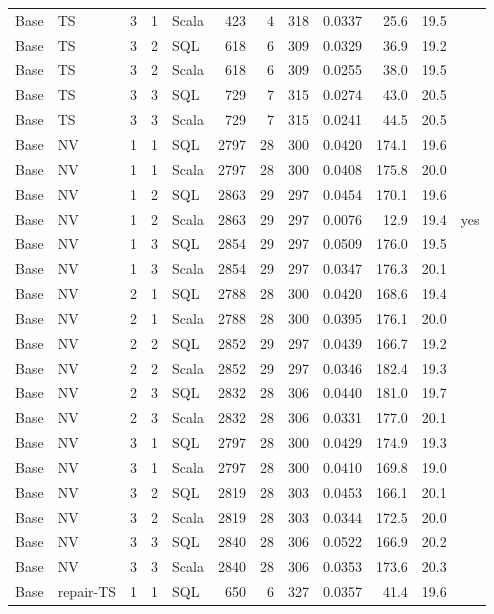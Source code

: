 {\begin{longtable}{@{}llcclrrrrrrc@{}}
Base & TS & 3 & 1 & Scala & 423 & 4 & 318 & 0.0337 & 25.6 & 19.5 & \\
Base & TS & 3 & 2 & SQL & 618 & 6 & 309 & 0.0329 & 36.9 & 19.2 & \\
Base & TS & 3 & 2 & Scala & 618 & 6 & 309 & 0.0255 & 38.0 & 19.5 & \\
Base & TS & 3 & 3 & SQL & 729 & 7 & 315 & 0.0274 & 43.0 & 20.5 & \\
Base & TS & 3 & 3 & Scala & 729 & 7 & 315 & 0.0241 & 44.5 & 20.5 & \\
Base & NV & 1 & 1 & SQL & 2797 & 28 & 300 & 0.0420 & 174.1 & 19.6 & \\
Base & NV & 1 & 1 & Scala & 2797 & 28 & 300 & 0.0408 & 175.8 & 20.0 & \\
Base & NV & 1 & 2 & SQL & 2863 & 29 & 297 & 0.0454 & 170.1 & 19.6 & \\
Base & NV & 1 & 2 & Scala & 2863 & 29 & 297 & 0.0076 & 12.9 & 19.4 & yes\\
Base & NV & 1 & 3 & SQL & 2854 & 29 & 297 & 0.0509 & 176.0 & 19.5 & \\
Base & NV & 1 & 3 & Scala & 2854 & 29 & 297 & 0.0347 & 176.3 & 20.1 & \\
Base & NV & 2 & 1 & SQL & 2788 & 28 & 300 & 0.0420 & 168.6 & 19.4 & \\
Base & NV & 2 & 1 & Scala & 2788 & 28 & 300 & 0.0395 & 176.1 & 20.0 & \\
Base & NV & 2 & 2 & SQL & 2852 & 29 & 297 & 0.0439 & 166.7 & 19.2 & \\
Base & NV & 2 & 2 & Scala & 2852 & 29 & 297 & 0.0346 & 182.4 & 19.3 & \\
Base & NV & 2 & 3 & SQL & 2832 & 28 & 306 & 0.0440 & 181.0 & 19.7 & \\
Base & NV & 2 & 3 & Scala & 2832 & 28 & 306 & 0.0331 & 177.0 & 20.1 & \\
Base & NV & 3 & 1 & SQL & 2797 & 28 & 300 & 0.0429 & 174.9 & 19.3 & \\
Base & NV & 3 & 1 & Scala & 2797 & 28 & 300 & 0.0410 & 169.8 & 19.0 & \\
Base & NV & 3 & 2 & SQL & 2819 & 28 & 303 & 0.0453 & 166.1 & 20.1 & \\
Base & NV & 3 & 2 & Scala & 2819 & 28 & 303 & 0.0344 & 172.5 & 20.0 & \\
Base & NV & 3 & 3 & SQL & 2840 & 28 & 306 & 0.0522 & 166.9 & 20.2 & \\
Base & NV & 3 & 3 & Scala & 2840 & 28 & 306 & 0.0353 & 173.6 & 20.3 & \\
Base & repair-TS & 1 & 1 & SQL & 650 & 6 & 327 & 0.0357 & 41.4 & 19.6 & \\

\end{longtable}}
